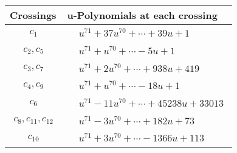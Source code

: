 \documentclass[1p]{elsarticle_modified}
\theoremstyle{definition}
\begin{document}
\begin{tabular}{m{50pt}|m{274pt}}
Crossings & \hspace{64pt}u-Polynomials at each crossing \\
\hline $$\begin{aligned}c_{1}\end{aligned}$$&$\begin{aligned}
&u^{71}+37 u^{70}+\cdots+39 u+1
\end{aligned}$\\
\hline $$\begin{aligned}c_{2},c_{5}\end{aligned}$$&$\begin{aligned}
&u^{71}+u^{70}+\cdots-5 u+1
\end{aligned}$\\
\hline $$\begin{aligned}c_{3},c_{7}\end{aligned}$$&$\begin{aligned}
&u^{71}+2 u^{70}+\cdots+938 u+419
\end{aligned}$\\
\hline $$\begin{aligned}c_{4},c_{9}\end{aligned}$$&$\begin{aligned}
&u^{71}+u^{70}+\cdots-18 u+1
\end{aligned}$\\
\hline $$\begin{aligned}c_{6}\end{aligned}$$&$\begin{aligned}
&u^{71}-11 u^{70}+\cdots+45238 u+33013
\end{aligned}$\\
\hline $$\begin{aligned}c_{8},c_{11},c_{12}\end{aligned}$$&$\begin{aligned}
&u^{71}-3 u^{70}+\cdots+182 u+73
\end{aligned}$\\
\hline $$\begin{aligned}c_{10}\end{aligned}$$&$\begin{aligned}
&u^{71}+3 u^{70}+\cdots-1366 u+113
\end{aligned}$\\
\hline
\end{tabular}\\~\\
\newpage\renewcommand{\arraystretch}{1}
\end{document}
